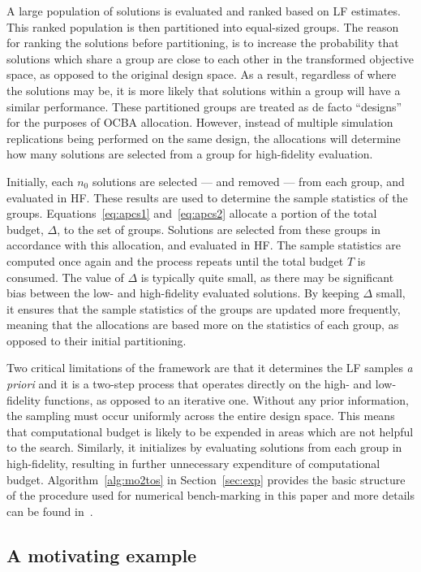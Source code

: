 A large population of solutions is evaluated and ranked based on LF estimates. This ranked population is then partitioned into equal-sized groups. The reason for ranking the solutions before partitioning, is to increase the probability that solutions which share a group are close to each other in the transformed objective space, as opposed to the original design space. As a result, regardless of where the solutions may be, it is more likely that solutions within a group will have a similar performance. These partitioned groups are treated as de facto ``designs'' for the purposes of OCBA allocation. However, instead of multiple simulation replications being performed on the same design, the allocations will determine how many solutions are selected from a group for high-fidelity evaluation.

Initially, each $n_0$ solutions are selected --- and removed --- from each group, and evaluated in HF. These results are used to determine the sample statistics of the groups. Equations~\ref{eq:apcs1} and~\ref{eq:apcs2} allocate a portion of the total budget, $\Delta$, to the set of groups. Solutions are selected from these groups in accordance with this allocation, and evaluated in HF. The sample statistics are computed once again and the process repeats until the total budget $T$ is consumed. The value of $\Delta$ is typically quite small, as there may be significant bias between the low- and high-fidelity evaluated solutions. By keeping $\Delta$ small, it ensures that the sample statistics of the groups are updated more frequently, meaning that the allocations are based more on the statistics of each group, as opposed to their initial partitioning.

Two critical limitations of the \motos{} framework are that it determines the LF samples \emph{a priori} and it is a two-step process that operates directly on the high- and low-fidelity functions, as opposed to an iterative one. Without any prior information, the sampling must occur uniformly across the entire design space. This means that computational budget is likely to be expended in areas which are not helpful to the search. Similarly, it initializes by evaluating solutions from each group in high-fidelity, resulting in further unnecessary expenditure of computational budget. Algorithm~\ref{alg:mo2tos} in Section~\ref{sec:exp} provides the basic structure of the \motos{} procedure used for numerical bench-marking in this paper and more details can be found in~\cite{xu2016mo2tos}.

\subsection{A motivating example}

